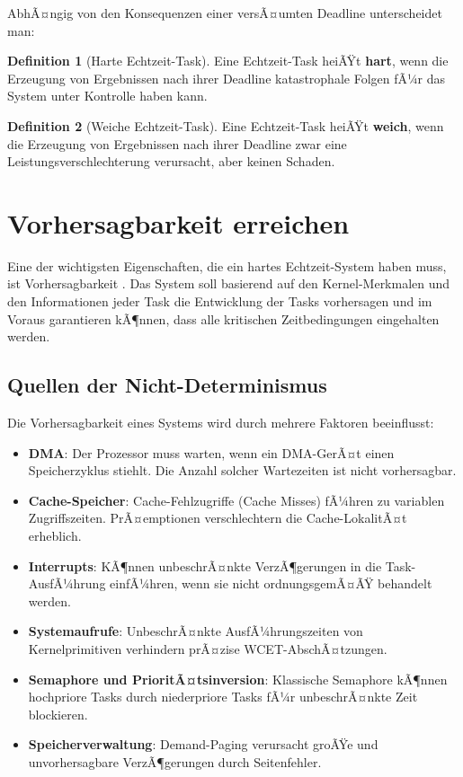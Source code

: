 ﻿\documentclass[a4paper,12pt]{report}
\theoremstyle{definition}
\newtheorem{definition}{Definition}[chapter]
\begin{document}
AbhÃ¤ngig von den Konsequenzen einer versÃ¤umten Deadline unterscheidet man:

\begin{definition}[Harte Echtzeit-Task]
	Eine Echtzeit-Task heiÃŸt \textbf{hart}, wenn die Erzeugung von Ergebnissen nach
	ihrer Deadline katastrophale Folgen fÃ¼r das System unter Kontrolle haben kann.
\end{definition}

\begin{definition}[Weiche Echtzeit-Task]
	Eine Echtzeit-Task heiÃŸt \textbf{weich}, wenn die Erzeugung von Ergebnissen nach
	ihrer Deadline zwar eine Leistungsverschlechterung verursacht, aber keinen Schaden.
\end{definition}

\section{Vorhersagbarkeit erreichen}

Eine der wichtigsten Eigenschaften, die ein hartes Echtzeit-System haben muss,
ist Vorhersagbarkeit \cite{Stankovic1988}. Das System soll basierend auf den
Kernel-Merkmalen und den Informationen jeder Task die Entwicklung der Tasks vorhersagen
und im Voraus garantieren kÃ¶nnen, dass alle kritischen Zeitbedingungen eingehalten werden.

\subsection{Quellen der Nicht-Determinismus}

Die Vorhersagbarkeit eines Systems wird durch mehrere Faktoren beeinflusst:

\begin{itemize}
	\item \textbf{DMA}: Der Prozessor muss warten, wenn ein DMA-GerÃ¤t einen Speicherzyklus
	      stiehlt. Die Anzahl solcher Wartezeiten ist nicht vorhersagbar.
	\item \textbf{Cache-Speicher}: Cache-Fehlzugriffe (Cache Misses) fÃ¼hren zu variablen
	      Zugriffszeiten. PrÃ¤emptionen verschlechtern die Cache-LokalitÃ¤t erheblich.
	\item \textbf{Interrupts}: KÃ¶nnen unbeschrÃ¤nkte VerzÃ¶gerungen in die Task-AusfÃ¼hrung
	      einfÃ¼hren, wenn sie nicht ordnungsgemÃ¤ÃŸ behandelt werden.
	\item \textbf{Systemaufrufe}: UnbeschrÃ¤nkte AusfÃ¼hrungszeiten von Kernelprimitiven
	      verhindern prÃ¤zise WCET-AbschÃ¤tzungen.
	\item \textbf{Semaphore und PrioritÃ¤tsinversion}: Klassische Semaphore kÃ¶nnen
	      hochpriore Tasks durch niederpriore Tasks fÃ¼r unbeschrÃ¤nkte Zeit blockieren.
	\item \textbf{Speicherverwaltung}: Demand-Paging verursacht groÃŸe und unvorhersagbare
	      VerzÃ¶gerungen durch Seitenfehler.
\end{itemize}
\end{document}
